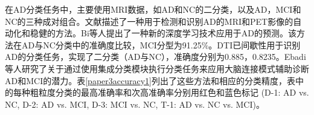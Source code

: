 在AD分类任务中，主要使用MRI数据，如AD和NC的二分类\cite{xing2020dynamic,ebrahimi2021convolutional}，以及AD，MCI和NC的三种成对组合\cite{ahmed2015alzheimer,yang2017active,madusanka2019alzheimer,pan2020early,liu2022diagnosis}。文献\cite{vu2018non}描述了一种用于检测和识别AD的MRI和PET影像的自动化和稳健的方法。Bi等人\cite{bi2020computer}提出了一种新的深度学习技术应用于AD的预测。该方法在AD与NC分类中的准确度比较，MCI分型为91.25\%。DTI已间歇性用于识别AD的分类任务\cite{qu2021ai4ad,lella2021ensemble}，实现了二分类（AD与NC），准确度分别为0.885，0.8235。Ebadi等人\cite{ebadi2017ensemble}研究了关于通过使用集成分类模块执行分类任务来应用大脑连接模式辅助诊断AD和MCI的潜力。表\ref{paper3accuracy1}列出了这些方法和相应的分类精度，表中的每种粗粒度分类的最高准确率和次高准确率分别用红色和蓝色标记 (D-1: AD vs. NC, D-2: AD vs. MCI, D-3: MCI vs. NC, T-1: AD vs. NC vs. MCI)。


